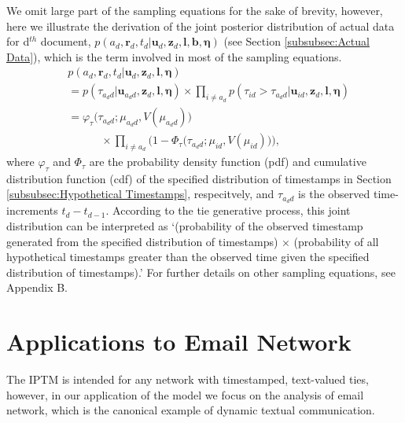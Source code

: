 \documentclass[twoside]{article}
\begin{document}
   We omit large part of the sampling equations for the sake of brevity, however, here we illustrate the derivation of the joint posterior distribution of actual data for d$^{th}$ document, $p(a_d, \boldsymbol{r}_d, t_d|\boldsymbol{u}_{d}, \boldsymbol{z}_d,\boldsymbol{l}, \boldsymbol{b}, \boldsymbol{\eta})$ (see Section \ref{subsubsec:Actual Data}), which is the term involved in most of the sampling equations. 
  \begin{equation*}
  \begin{aligned}
  &p(a_d, \boldsymbol{r}_d, t_d|\boldsymbol{u}_{d}, \boldsymbol{z}_d,\boldsymbol{l}, \boldsymbol{\eta}) \\&= p(\tau_{a_d d}|\boldsymbol{u}_{a_dd},\boldsymbol{z}_d,\boldsymbol{l}, \boldsymbol{\eta})\times \prod_{i\neq a_d} p(\tau_{id} >\tau_{a_d d}|\boldsymbol{u}_{id},\boldsymbol{z}_d,\boldsymbol{l}, \boldsymbol{\eta}) \\& 
  = \varphi_{\tau}\big(\tau_{a_d d}; \mu_{a_d d}, V(\mu_{a_d d})\big)\\&\quad\quad\quad \times  \prod_{i\neq a_d}\Big(1-\Phi_{\tau} \big(\tau_{a_d d}; \mu_{i d}, V(\mu_{i d})\big) \Big),
  \end{aligned}
    \label{eqn:tieposterior}
\end{equation*}  
  where $\varphi_\tau$ and $\Phi_\tau$ are the probability density function (pdf) and cumulative distribution function (cdf) of the specified distribution of timestamps in Section \ref{subsubsec:Hypothetical Timestamps}, respecitvely, and $\tau_{a_d d}$ is the observed time-increments $t_d - t_{d-1}$. According to the tie generative process, this joint distribution can be interpreted as `(probability of the observed timestamp generated from the specified distribution of timestamps) $\times$ (probability of all hypothetical timestamps greater than the observed time given the specified distribution of timestamps).' For further details on other sampling equations, see Appendix B.

\section{Applications to Email Network}\label{sec:Application}
The IPTM is intended for any network with timestamped, text-valued ties, however, in our application of the model we focus on the analysis of email network, which is the canonical example of dynamic textual communication. 
\end{document}
